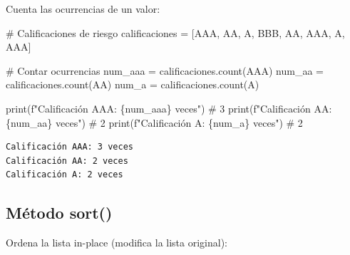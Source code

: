 \documentclass[
  doc,
  floatsintext,
  longtable,
  a4paper,
  nolmodern,
  notxfonts,
  notimes,
  12pt,
  colorlinks=true,linkcolor=blue,citecolor=blue,urlcolor=blue]{apa7}
\newenvironment{Shaded}{\begin{snugshade}}{\end{snugshade}}
\newcommand{\BuiltInTok}[1]{\textcolor[rgb]{0.00,0.23,0.31}{#1}}
\newcommand{\CommentTok}[1]{\textcolor[rgb]{0.37,0.37,0.37}{#1}}
\newcommand{\NormalTok}[1]{\textcolor[rgb]{0.00,0.23,0.31}{#1}}
\newcommand{\OperatorTok}[1]{\textcolor[rgb]{0.37,0.37,0.37}{#1}}
\newcommand{\SpecialCharTok}[1]{\textcolor[rgb]{0.37,0.37,0.37}{#1}}
\newcommand{\SpecialStringTok}[1]{\textcolor[rgb]{0.13,0.47,0.30}{#1}}
\newcommand{\StringTok}[1]{\textcolor[rgb]{0.13,0.47,0.30}{#1}}
\begin{document}
Cuenta las ocurrencias de un valor:

\begin{Shaded}
\begin{Highlighting}[]
\CommentTok{\# Calificaciones de riesgo}
\NormalTok{calificaciones }\OperatorTok{=}\NormalTok{ [}\StringTok{\textquotesingle{}AAA\textquotesingle{}}\NormalTok{, }\StringTok{\textquotesingle{}AA\textquotesingle{}}\NormalTok{, }\StringTok{\textquotesingle{}A\textquotesingle{}}\NormalTok{, }\StringTok{\textquotesingle{}BBB\textquotesingle{}}\NormalTok{, }\StringTok{\textquotesingle{}AA\textquotesingle{}}\NormalTok{, }\StringTok{\textquotesingle{}AAA\textquotesingle{}}\NormalTok{, }\StringTok{\textquotesingle{}A\textquotesingle{}}\NormalTok{, }\StringTok{\textquotesingle{}AAA\textquotesingle{}}\NormalTok{]}

\CommentTok{\# Contar ocurrencias}
\NormalTok{num\_aaa }\OperatorTok{=}\NormalTok{ calificaciones.count(}\StringTok{\textquotesingle{}AAA\textquotesingle{}}\NormalTok{)}
\NormalTok{num\_aa }\OperatorTok{=}\NormalTok{ calificaciones.count(}\StringTok{\textquotesingle{}AA\textquotesingle{}}\NormalTok{)}
\NormalTok{num\_a }\OperatorTok{=}\NormalTok{ calificaciones.count(}\StringTok{\textquotesingle{}A\textquotesingle{}}\NormalTok{)}

\BuiltInTok{print}\NormalTok{(}\SpecialStringTok{f"Calificación AAA: }\SpecialCharTok{\{}\NormalTok{num\_aaa}\SpecialCharTok{\}}\SpecialStringTok{ veces"}\NormalTok{)  }\CommentTok{\# 3}
\BuiltInTok{print}\NormalTok{(}\SpecialStringTok{f"Calificación AA: }\SpecialCharTok{\{}\NormalTok{num\_aa}\SpecialCharTok{\}}\SpecialStringTok{ veces"}\NormalTok{)    }\CommentTok{\# 2}
\BuiltInTok{print}\NormalTok{(}\SpecialStringTok{f"Calificación A: }\SpecialCharTok{\{}\NormalTok{num\_a}\SpecialCharTok{\}}\SpecialStringTok{ veces"}\NormalTok{)      }\CommentTok{\# 2}
\end{Highlighting}
\end{Shaded}

\begin{verbatim}
Calificación AAA: 3 veces
Calificación AA: 2 veces
Calificación A: 2 veces
\end{verbatim}

\subsection{Método sort()}\label{muxe9todo-sort}

Ordena la lista in-place (modifica la lista original):
\end{document}
